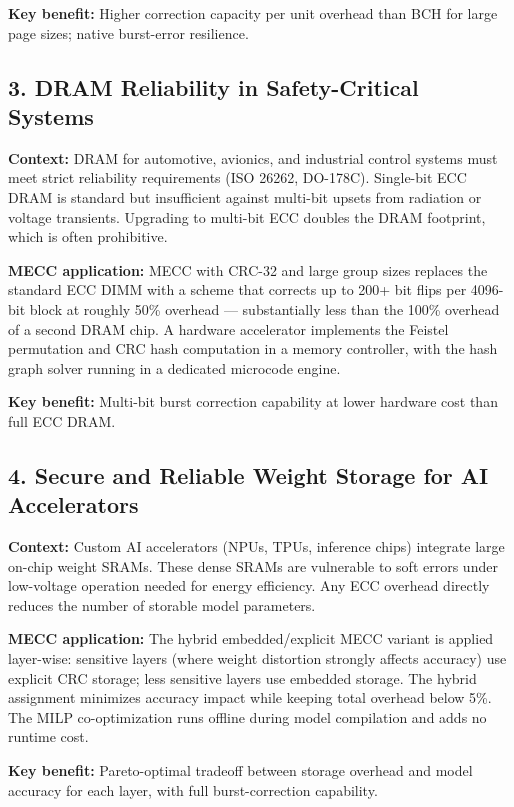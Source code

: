 \textbf{Key benefit:} Higher correction capacity per unit overhead than BCH for large page sizes; native burst-error resilience.

\subsection*{3. DRAM Reliability in Safety-Critical Systems}

\textbf{Context:} DRAM for automotive, avionics, and industrial control systems must meet strict reliability requirements (ISO 26262, DO-178C).
Single-bit ECC DRAM is standard but insufficient against multi-bit upsets from radiation or voltage transients.
Upgrading to multi-bit ECC doubles the DRAM footprint, which is often prohibitive.

\textbf{MECC application:} MECC with CRC-32 and large group sizes replaces the standard ECC DIMM with a scheme that corrects up to 200+ bit flips per 4096-bit block at roughly 50\% overhead --- substantially less than the 100\% overhead of a second DRAM chip.
A hardware accelerator implements the Feistel permutation and CRC hash computation in a memory controller, with the hash graph solver running in a dedicated microcode engine.

\textbf{Key benefit:} Multi-bit burst correction capability at lower hardware cost than full ECC DRAM.

\subsection*{4. Secure and Reliable Weight Storage for AI Accelerators}

\textbf{Context:} Custom AI accelerators (NPUs, TPUs, inference chips) integrate large on-chip weight SRAMs.
These dense SRAMs are vulnerable to soft errors under low-voltage operation needed for energy efficiency.
Any ECC overhead directly reduces the number of storable model parameters.

\textbf{MECC application:} The hybrid embedded/explicit MECC variant is applied layer-wise: sensitive layers (where weight distortion strongly affects accuracy) use explicit CRC storage; less sensitive layers use embedded storage.
The hybrid assignment minimizes accuracy impact while keeping total overhead below 5\%.
The MILP co-optimization runs offline during model compilation and adds no runtime cost.

\textbf{Key benefit:} Pareto-optimal tradeoff between storage overhead and model accuracy for each layer, with full burst-correction capability.

